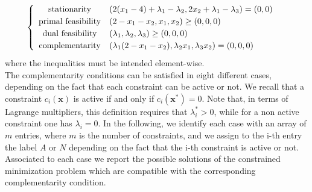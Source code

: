 \documentclass[a4paper,11pt]{article}
\begin{document}
\begin{equation}
	\begin{cases}
	\begin{array}{c l}
	\text{stationarity} & (2(x_{1}-4) + \lambda_{1} -\lambda_{2}, 2x_{2}+\lambda_{1}-\lambda_{3}) = (0,0) \\
	\text{primal feasibility} &(2 - x_{1} -x_{2}, x_{1}, x_{2}) \ge (0,0,0) \\
	\text{dual feasibility} & (\lambda_{1}, \lambda_{2}, \lambda_{3}) \ge (0,0,0) \\
	\text{complementarity} &(\lambda_{1}(2-x_{1}-x_{2}), \lambda_{2}x_{1}, \lambda_{3}x_{2}) = (0,0,0)
	\end{array}
	\end{cases}
	\label{eq:KKT system f_a}
\end{equation}
where the inequalities must be intended element-wise.\\

\noindent The complementarity conditions can be satisfied in eight different cases, depending on the fact that each constraint can be active or not. We recall that a constraint $c_{i}(\textbf{x})$ is active if and only if $c_{i}(\textbf{x}^*)=0$. Note that, in terms of Lagrange multipliers, this definition requires that $\lambda_{i}^*>0$, while for a non active constraint one has $\lambda_{i}=0$. In the following, we identify each case with an array of $m$ entries, where $m$ is the number of constraints, and we assign to the i-th entry the label $A$ or $N$ depending on the fact that the i-th constraint is active or not. Associated to each case we report the possible solutions of the constrained minimization problem which are compatible with the corresponding complementarity condition.
\end{document}

